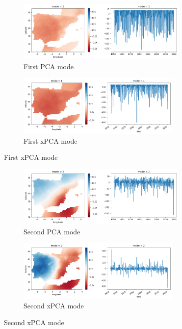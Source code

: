\documentclass[11pt, oneside]{book}
\theoremstyle{plain}
\theoremstyle{remark}
\begin{document}
\begin{figure}[h!]
\centering
\begin{subfigure}{.5\textwidth}
    \centering
    \includegraphics[width=.95\linewidth, height=3cm]{spain-mode1}
    \caption{First PCA mode}
\end{subfigure}%
\begin{subfigure}{.5\textwidth}
    \centering
    \includegraphics[width=.95\linewidth, height=3cm]{spain-tran-mode1}
    \caption{First xPCA mode}
\end{subfigure}
\end{figure}
\begin{figure}[h!]
\centering
\begin{subfigure}{.5\textwidth}
    \centering
    \includegraphics[width=.95\linewidth, height=3cm]{spain-mode2}
    \caption{Second PCA mode}
\end{subfigure}%
\begin{subfigure}{.5\textwidth}
    \centering
    \includegraphics[width=.95\linewidth, height=3cm]{spain-tran-mode2}
    \caption{Second xPCA mode}
\end{subfigure}
\end{figure}
\end{document}
